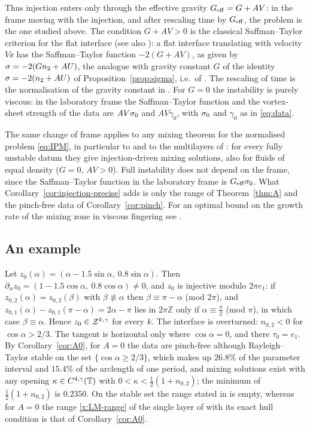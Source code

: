Thus injection enters only through the effective gravity $G_{\rm eff}=G+AV$: in the frame moving with the injection, and after rescaling time by $G_{\rm eff}$, the problem is the one studied above. The
condition $G+AV>0$ is the classical Saffman--Taylor criterion for the flat interface \cite{ST58} (see also \cite{Hom87}): a flat interface translating with velocity $V\ee$ has the Saffman--Taylor function
$-2(G+AV)$, as given by $\sigma=-2(Gn_2+AU)$, the analogue with gravity constant $G$ of the identity $\sigma=-2(n_2+AU)$ of Proposition~\ref{prop:sigma}, i.e.\ of \cite[(3.8)]{LM26}. The rescaling of
time is the normalisation of the gravity constant in \cite[Sec.~1.1]{LM26}. For $G=0$ the instability is purely viscous: in the laboratory frame the Saffman--Taylor function and the vortex-sheet strength
of the data are $AV\sigma_0$ and $AV\gamma_0$, with $\sigma_0$ and $\gamma_0$ as in \eqref{eq:data}.

The same change of frame applies to any mixing theorem for the normalised problem \eqref{eq:IPM}, in particular to \cite[Thm.~1.1]{LM26} and to the multilayers of \cite[Sec.~7.5]{LM26}: for every
fully unstable datum they give injection-driven mixing solutions, also for fluids of equal density ($G=0$, $AV>0$). Full instability does not depend on the frame, since the Saffman--Taylor function in the
laboratory frame is $G_{\rm eff}\sigma_0$. What Corollary~\ref{cor:injection-precise} adds is only the range of Theorem~\ref{thm:A} and the pinch-free data of Corollary~\ref{cor:pinch}. For an optimal bound
on the growth rate of the mixing zone in viscous fingering see \cite{Ott97}.

\subsection{An example}
Let $z_0(\alpha)=(\alpha-1.5\sin\alpha,\ 0.8\sin\alpha)$. Then $\partial_\alpha z_0=(1-1.5\cos\alpha,\ 0.8\cos\alpha)\ne0$, and $z_0$ is injective modulo $2\pi e_1$: if $z_{0,2}(\alpha)=z_{0,2}(\beta)$ with
$\beta\not\equiv\alpha$ then $\beta\equiv\pi-\alpha$ (mod $2\pi$), and $z_{0,1}(\alpha)-z_{0,1}(\pi-\alpha)=2\alpha-\pi$ lies in $2\pi\mathbb Z$ only if $\alpha\equiv\frac\pi2$ (mod $\pi$), in which case
$\beta\equiv\alpha$. Hence $z_0\in\mathcal{Z}^{k,\gamma}$ for every $k$. The interface is overturned:
$n_{0,2}<0$ for $\cos\alpha>2/3$. The tangent is horizontal only where $\cos\alpha=0$, and there $\tau_0=e_1$. By Corollary~\ref{cor:A0}, for $A=0$ the data are pinch-free although Rayleigh--Taylor
stable on the set $\{\cos\alpha\ge2/3\}$, which makes up $26.8\%$ of the parameter interval and $15.4\%$ of the arclength of one period, and mixing solutions exist with any opening
$\kappa\in C^{4,\gamma}(\mathbb{T})$ with $0<\kappa<\frac12(1+n_{0,2})$; the minimum of $\frac12(1+n_{0,2})$ is $0.2350$. On the stable set the range stated in \cite{LM26} is empty, whereas for $A=0$ the
range \eqref{x:LM-range} of the single layer of \cite{LM26} with its exact hull condition is that of Corollary~\ref{cor:A0}.

